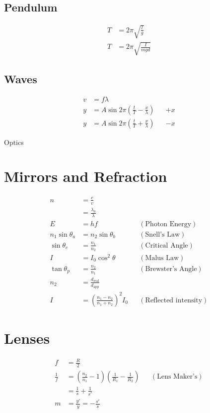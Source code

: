 \documentclass[10pt]{article}
\begin{document}
\begin{multicols*}{4}
\subsection{Pendulum}

\begin{align*}
    T &= 2\pi \sqrt{\frac{l}{g}}\\
    T &= 2\pi \sqrt{\frac{I}{mgd}}
\end{align*}

\subsection{Waves}

\begin{align*}
    v &= f\lambda\\
    y &= A \sin 2\pi \left({\frac{t}{T} - \frac{x}{\lambda}}\right) &&
    +x\\
    y &= A \sin 2\pi \left({\frac{t}{T} + \frac{x}{\lambda}}\right) &&
    -x
\end{align*}

\vfill\null\columnbreak
\begin{center}
    \Large
    Optics
\end{center}

\section{Mirrors and Refraction}

\begin{align*}
    n &= \frac{c}{v}\\
      &= \frac{\lambda_0}{\lambda}\\
    E &= hf && (\text{Photon Energy})\\
    n_1 \sin \theta_a &= n_2 \sin \theta_b && (\text{Snell's Law})\\
    \sin \theta_c &= \frac{n_1}{n_2} && (\text{Critical Angle})\\
    I &= I_0\cos^2 \theta && (\text{Malus Law})\\
    \tan \theta_p &= \frac{n_2}{n_1} && (\text{Brewster's Angle})\\
    n_2 &= \frac{d_\text{real}}{d_\text{app}}\\
    I &= \left({\frac{n_1 - n_2}{n_1 + n_2}}\right)^2I_0 &&
    (\text{Reflected intensity})
\end{align*}

\section{Lenses}

\begin{align*}
    f &= \frac{R}{2}\\
    \frac{1}{f} &= \left({\frac{n_2}{n_1} - 1}\right)
    \left({\frac{1}{R_1} - \frac{1}{R_2}}\right) && (\text{Lens
    Maker's})\\
    &= \frac{1}{s} + \frac{1}{s'}\\
    m &= \frac{y'}{y} = -\frac{s'}{s}
\end{align*}

\end{multicols*}
\end{document}
